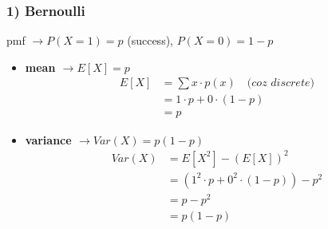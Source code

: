 \documentclass[11pt,a4paper]{article}
\begin{document}
\subsubsection*{1) Bernoulli}
pmf $\rightarrow P(X=1) = p$ (success), $P(X=0) = 1-p$
\begin{itemize}
    \item \textbf{mean $\rightarrow E[X] = p$}
    \begin{align*}
        E[X] &= \sum x \cdot p(x) \quad \textit{(coz discrete)} \\
        &= 1 \cdot p + 0 \cdot (1-p) \\
        &= p
    \end{align*}
    \item \textbf{variance $\rightarrow Var(X) = p(1-p)$}
    \begin{align*}
        Var(X) &= E[X^2] - (E[X])^2 \\
        &= (1^2 \cdot p + 0^2 \cdot (1-p)) - p^2 \\
        &= p - p^2 \\
        &= p(1-p)
    \end{align*}
\end{itemize}
\end{document}
